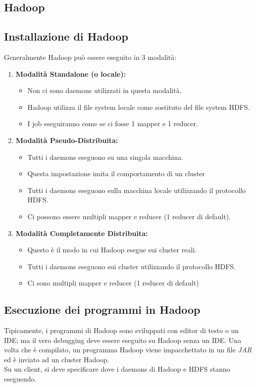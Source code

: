 \documentclass{article}
\begin{document}
\begin{appendices}
\newpage
\section{Hadoop}
\subsection{Installazione di Hadoop}
Generalmente Hadoop può essere eseguito in 3 modalità:
\begin{enumerate}
    \item \textbf{Modalità Standalone (o locale):} 
    \begin{itemize}
        \item Non ci sono daemons utilizzati in questa modalità.
        \item Hadoop utilizza il file system locale come sostituto del file system HDFS.
        \item I job eseguiranno come se ci fosse 1 mapper e 1 reducer.
    \end{itemize}
    \item \textbf{Modalità Pseudo-Distribuita:}
    \begin{itemize}
        \item Tutti i daemons eseguono su una singola macchina.
        \item Questa impostazione imita il comportamento di un cluster
        \item Tutti i daemons eseguono sulla macchina locale utilizzando il protocollo HDFS.
        \item Ci possono essere multipli mapper e reducer (1 reducer di default).
    \end{itemize}
    \item \textbf{Modalità Completamente Distribuita:}
    \begin{itemize}
        \item Questo è il modo in cui Hadoop esegue sui cluster reali. 
        \item Tutti i daemons eseguono sui cluster utilizzando il protocollo HDFS.
        \item Ci sono multipli mapper e reducer (1 reducer di default)
    \end{itemize}
\end{enumerate}

\subsection{Esecuzione dei programmi in Hadoop}
Tipicamente, i programmi di Hadoop sono sviluppati con editor di testo o un IDE; ma il vero debugging deve essere eseguito su Hadoop senza un IDE. Una volta che è compilato, un programma Hadoop viene impacchettato in un file \textit{JAR} ed è inviato ad un cluster Hadoop. \\
Su un client, si deve specificare dove i daemons di Hadoop e HDFS stanno eseguendo.


\end{appendices}
\end{document}
